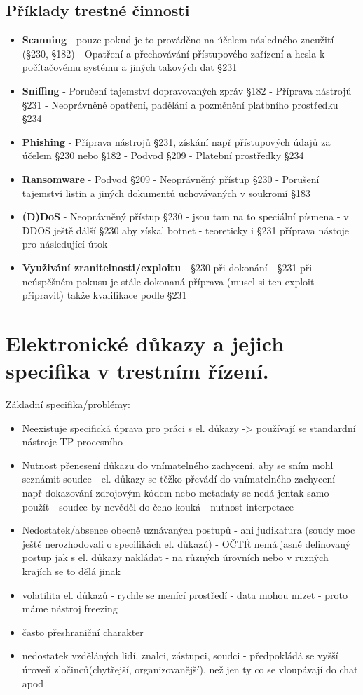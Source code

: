 \subsection{Příklady trestné činnosti}
\begin{itemize}
    \item \textbf{Scanning} - pouze pokud je to prováděno na účelem následného zneužití (§230, §182) - Opatření a
přechovávání přístupového zařízení a hesla k počítačovému systému a jiných takových dat §231
    \item \textbf{Sniffing} - Poručení tajemství dopravovaných zpráv §182 - Příprava nástrojů §231 - Neoprávněné
opatření, padělání a pozměnění platbního prostředku §234
    \item \textbf{Phishing} - Příprava nástrojů §231, získání např přístupových údajů za účelem §230 nebo §182 -
Podvod §209 - Platební prostředky §234
    \item \textbf{Ransomware} - Podvod §209 - Neoprávněný přístup §230 - Porušení tajemství listin a jiných
dokumentů uchovávaných v soukromí §183
    \item \textbf{(D)DoS} - Neoprávněný přístup §230 - jsou tam na to speciální písmena - v DDOS ještě dálší §230
aby získal botnet - teoreticky i §231 příprava nástoje pro následující útok
    \item \textbf{Využivání zranitelnosti/exploitu} - §230 při dokonání - §231 při neúspěšném pokusu je stále
dokonaná příprava (musel si ten exploit připravit) takže kvalifikace podle §231
\end{itemize}


\newpage
\section{Elektronické důkazy a jejich specifika v trestním řízení.}
Základní specifika/problémy:
\begin{itemize}
    \item Neexistuje specifická úprava pro práci s el. důkazy -> používají se standardní nástroje TP procesního
    \item Nutnost přenesení důkazu do vnímatelného zachycení, aby se sním mohl seznámit soudce - el. důkazy se těžko převádí do vnímatelného zachycení - např dokazování zdrojovým kódem nebo metadaty se nedá jentak samo použít - soudce by nevěděl do čeho kouká - nutnost interpetace
    \item Nedostatek/absence obecně uznávaných postupů - ani judikatura (soudy moc ještě nerozhodovali o specifikách el. důkazů) - OČTŘ nemá jasně definovaný postup jak s el. důkazy nakládat - na různých úrovních nebo v ruzných krajích se to dělá jinak
    \item volatilita el. důkazů - rychle se menící prostředí - data mohou mizet - proto máme nástroj freezing
    \item často přeshraniční charakter
    \item nedostatek vzděláných lidí, znalci, zástupci, soudci - předpokládá se vyšší úroveň zločinců(chytřejší, organizovanější), než jen ty co se vloupávají do chat apod
\end{itemize}

